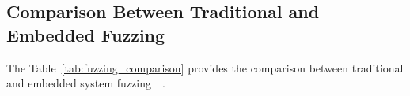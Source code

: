 


\subsection{Comparison Between Traditional and Embedded Fuzzing}

The Table~\ref{tab:fuzzing_comparison} provides the comparison between traditional
and embedded system fuzzing~\cite{yun2022fuzzing}~\cite{9742291}.

